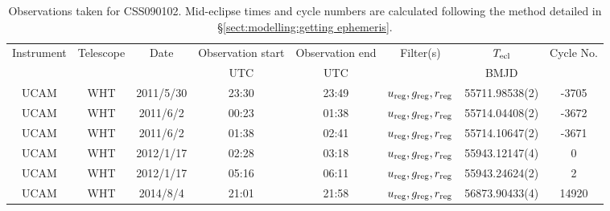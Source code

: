 \begin{table}
	\begin{center}
		\caption{Observations taken for CSS090102. Mid-eclipse times and cycle numbers are calculated following the method detailed in \S\ref{sect:modelling:getting ephemeris}.}
		\label{table:observing:observation logs CSS090102}
		\begin{tabular}{cccccccc}
			\hline
			Instrument & Telescope & Date & Observation start & Observation end & Filter(s) & $T_{\rm ecl}$ & Cycle No. \\
				&  &  & UTC & UTC &  & BMJD &  \\
			\hline
			\hline
			UCAM & WHT & 2011/5/30 & 23:30 & 23:49 & $u_{\rm reg},g_{\rm reg},r_{\rm reg}$ & 55711.98538(2)                                                                                                            &                                       -3705 \\
			UCAM & WHT & 2011/6/2  & 00:23 & 01:38 & $u_{\rm reg},g_{\rm reg},r_{\rm reg}$ & 55714.04408(2)                                                                                                            &                                       -3672 \\
			UCAM & WHT & 2011/6/2  & 01:38 & 02:41 & $u_{\rm reg},g_{\rm reg},r_{\rm reg}$ & 55714.10647(2)                                                                                                            &                                       -3671 \\
			UCAM & WHT & 2012/1/17 & 02:28 & 03:18 & $u_{\rm reg},g_{\rm reg},r_{\rm reg}$ & 55943.12147(4)                                                                                                            &                                           0 \\
			UCAM & WHT & 2012/1/17 & 05:16 & 06:11 & $u_{\rm reg},g_{\rm reg},r_{\rm reg}$ & 55943.24624(2)                                                                                                            &                                           2 \\
			UCAM & WHT & 2014/8/4  & 21:01 & 21:58 & $u_{\rm reg},g_{\rm reg},r_{\rm reg}$ & 56873.90433(4)                                                                                                            &                                       14920 \\
		   \hline
		\end{tabular}
	\end{center}
\end{table}